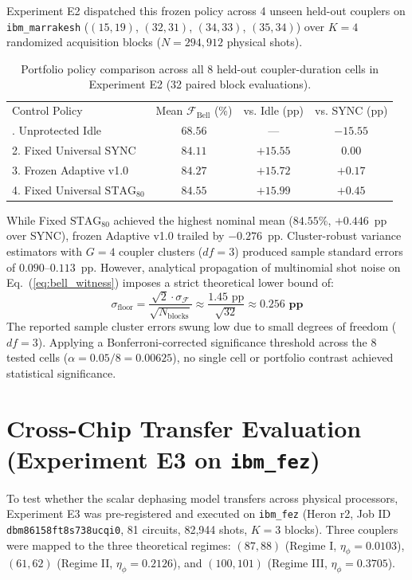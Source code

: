 \documentclass[aps,prl,twocolumn,amsmath,amssymb,superscriptaddress,floatfix]{revtex4-2}
\begin{document}
Experiment E2 dispatched this frozen policy across 4 unseen held-out couplers on \texttt{ibm\_marrakesh} ($(15, 19)$, $(32, 31)$, $(34, 33)$, $(35, 34)$) over $K = 4$ randomized acquisition blocks ($N = 294{,}912$ physical shots).

\begin{table}[h]
\caption{Portfolio policy comparison across all 8 held-out coupler-duration cells in Experiment E2 (32 paired block evaluations).}
\label{tab:e2}
\begin{ruledtabular}
\begin{tabular}{lccc}
Control Policy & Mean $\mathcal{F}_{\text{Bell}}$ (\%) & vs. Idle (pp) & vs. SYNC (pp) \\
\colrule
1. Unprotected Idle & $68.56$ & --- & $-15.55$ \\
2. Fixed Universal SYNC & $84.11$ & $+15.55$ & $0.00$ \\
3. Frozen Adaptive v1.0 & $84.27$ & $+15.72$ & $+0.17$ \\
4. Fixed Universal $\text{STAG}_{80}$ & $84.55$ & $+15.99$ & $\mathbf{+0.45}$ \\
\end{tabular}
\end{ruledtabular}
\end{table}

While Fixed $\text{STAG}_{80}$ achieved the highest nominal mean ($84.55\%$, $+0.446$~pp over SYNC), frozen Adaptive v1.0 trailed by $-0.276$~pp. Cluster-robust variance estimators with $G = 4$ coupler clusters ($df = 3$) produced sample standard errors of $0.090\text{--}0.113$~pp. However, analytical propagation of multinomial shot noise on Eq.~(\ref{eq:bell_witness}) imposes a strict theoretical lower bound of:
\begin{equation}
\sigma_{\text{floor}} = \frac{\sqrt{2} \cdot \sigma_{\mathcal{F}}}{\sqrt{N_{\text{blocks}}}} \approx \frac{1.45\text{ pp}}{\sqrt{32}} \approx \mathbf{0.256\text{ pp}}
\end{equation}
The reported sample cluster errors swung low due to small degrees of freedom ($df = 3$). Applying a Bonferroni-corrected significance threshold across the 8 tested cells ($\alpha = 0.05 / 8 = 0.00625$), no single cell or portfolio contrast achieved statistical significance.

\section{Cross-Chip Transfer Evaluation (Experiment E3 on \texttt{ibm\_fez})}
To test whether the scalar dephasing model transfers across physical processors, Experiment E3 was pre-registered and executed on \texttt{ibm\_fez} (Heron r2, Job ID \texttt{dbm86158ft8s738ucqi0}, 81 circuits, 82,944 shots, $K = 3$ blocks). Three couplers were mapped to the three theoretical regimes: $(87, 88)$ (Regime I, $\eta_\phi = 0.0103$), $(61, 62)$ (Regime II, $\eta_\phi = 0.2126$), and $(100, 101)$ (Regime III, $\eta_\phi = 0.3705$).
\end{document}
